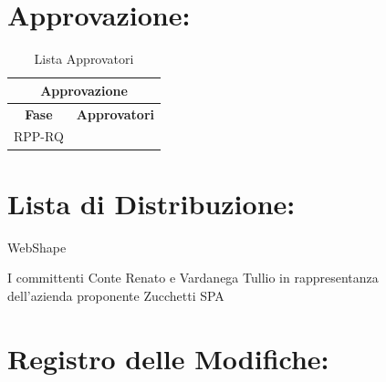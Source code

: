 \section*{\LARGE Approvazione:}
\begin{table}[!h]
	\begin{center}
		\begin{tabular}
			{|c|c|}
			\hline
			\multicolumn{2}{|c|}{ \textbf{Approvazione} } \\
			\hline
			\textbf{Fase} & \textbf{Approvatori} \\
			\hline
			\multirow{1}{*}{RPP-RQ} & \\
									
			\hline
		\end{tabular}
		\caption{Lista Approvatori} %
		\label{tabapprovazione}
	\end{center}
\end{table}

\textbf{}
\newpage
\section*{\LARGE Lista di Distribuzione:}

	\begin{elenconumerato}{\normindent}
		\item WebShape 
		\item I committenti Conte Renato e Vardanega Tullio in rappresentanza \\  dell'azienda proponente Zucchetti SPA
	\end{elenconumerato}




\section*{\Large Registro delle Modifiche:}



